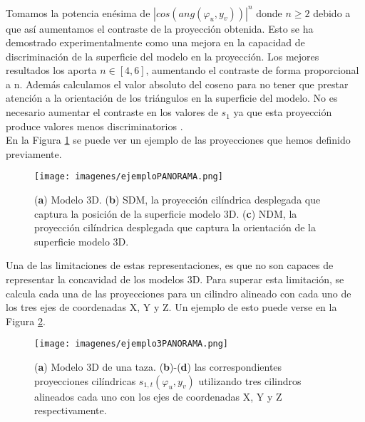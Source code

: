 Tomamos la potencia enésima de $|cos(ang(\varphi_u,y_v))|^{n}$ donde $n \ge 2$ debido a que así aumentamos el contraste de la proyección obtenida. Esto se ha demostrado experimentalmente como una mejora en la capacidad de discriminación de la superficie del modelo en la proyección. Los mejores resultados los aporta $n \in [4,6]$, aumentando el contraste de forma proporcional a n. Además calculamos el valor absoluto del coseno para no tener que prestar atención a la orientación de los triángulos en la superficie del modelo. No es necesario aumentar el contraste en los valores de $s_1$ ya que esta proyección produce valores menos discriminatorios \cite{papadakis2010panorama}.\\

En la Figura \ref{fig:ejemploPANORAMA} se puede ver un ejemplo de las proyecciones que hemos definido previamente.\\

\begin{figure}[ht]
    \centering
    \texttt{[image: imagenes/ejemploPANORAMA.png]}
    \caption[Ejemplo de la representación propuesta.]{(\textbf{a}) Modelo 3D. (\textbf{b}) SDM, la proyección cilíndrica desplegada que captura la posición de la superficie modelo 3D. (\textbf{c}) NDM, la proyección cilíndrica desplegada que captura la orientación de la superficie modelo 3D\cite{papadakis2010panorama}.}
    \label{fig:ejemploPANORAMA}
\end{figure}

Una de las limitaciones de estas representaciones, es que no son capaces de representar la concavidad de los modelos 3D. Para superar esta limitación, se calcula cada una de las proyecciones para un cilindro alineado con cada uno de los tres ejes de coordenadas X, Y y Z. Un ejemplo de esto puede verse en la Figura \ref{fig:ejemplo3PANORAMA}.

\begin{figure}[ht]
    \centering
    \texttt{[image: imagenes/ejemplo3PANORAMA.png]}
    \caption[Limitaciones de la representación propuesta.]{(\textbf{a}) Modelo 3D de una taza. (\textbf{b})-(\textbf{d}) las correspondientes proyecciones cilíndricas $s_{1,t}(\varphi_u , y_v)$ utilizando tres cilindros alineados cada uno con los ejes de coordenadas X, Y y Z respectivamente\cite{papadakis2010panorama}.}
    \label{fig:ejemplo3PANORAMA}
\end{figure}
% 
\newpage

